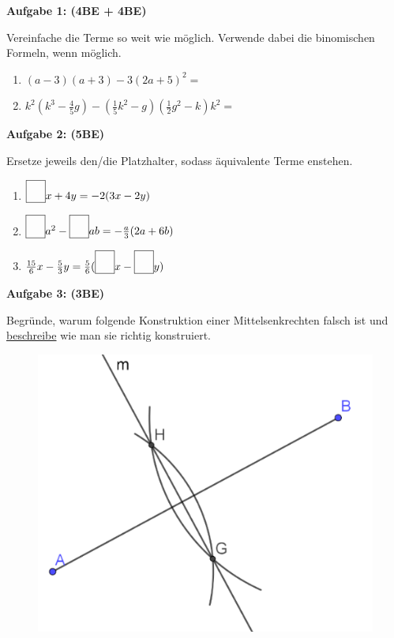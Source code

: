 \documentclass[a4paper,12pt]{article}
\newcommand{\Aufgabe}[1]{
  {
  \vspace*{0.5cm}
  \textsf{\textbf{Aufgabe #1}}
  \vspace*{0.2cm}
  
  }
}
\newcommand*{\quadratbox}{\textbf{\fbox{\phantom{\huge{?}}}}}%
\begin{document}
\vspace{1cm}

\Aufgabe{1: (4BE + 4BE)}
Vereinfache die Terme so weit wie möglich. Verwende dabei die binomischen
Formeln, wenn möglich.

\begin{enumerate}[label={\alph*)}]
  \item $(a-3)(a+3) -3(2a+5)^2=$
    \vspace{30mm}
    \newpage
\vspace*{-2cm}
  \item $k^2(k^3-\frac{4}{5}g)-(\frac{1}{5}k^2-g)(\frac{1}{2}g^2-k)k^2=$
    \vspace{50mm}
\end{enumerate}

\Aufgabe{2: (5BE)}

Ersetze jeweils den/die Platzhalter, sodass äquivalente Terme enstehen.

\begin{enumerate}[label={\alph*)}]
  \item $\quadratbox x+4y=-2(3x-2y)$
  \item $\quadratbox a^2-\quadratbox ab = - \frac{a}{3}(2a+6b)$
  \item $\frac{15}{6}x-\frac{5}{3}y=\frac{5}{6}(\quadratbox x - \quadratbox y)$
\end{enumerate}


\Aufgabe{3: (3BE)}

\begin{minipage}[t]{0.55\textwidth}
Begründe, warum folgende Konstruktion einer Mittelsenkrechten falsch ist und \underline{beschreibe} wie man sie richtig konstruiert.
\end{minipage}
\hspace*{2.05cm}
\begin{minipage}[t]{0.55\textwidth}
  \begin{figure}[H]
    \vspace{-1cm}
    \centering
    \includegraphics[width=0.7\linewidth]{7G_2SA_image1.png}
  \end{figure}
\end{minipage}
\end{document}
